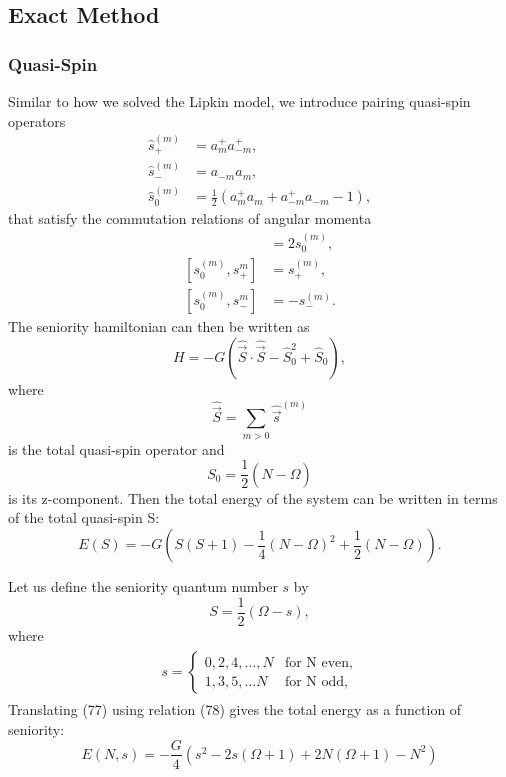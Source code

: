\documentclass[prb,aps,twocolumn,showpacs,10pt]{revtex4-2}
\begin{document}
\subsection{Exact Method}
\subsubsection{Quasi-Spin}

Similar to how we solved the Lipkin model, we introduce pairing quasi-spin operators
\begin{align}
\hat{s}_+^{(m)} &= a_m^+ a_{-m}^+,\\
\hat{s}_-^{(m)} &=  a_{-m} a_m,\\
\hat{s}_0^{(m)} &= \frac{1}{2} (a_m^+ a_m + a_{-m}^+ a_{-m} -1),
\end{align}
that satisfy the commutation relations of angular momenta
\begin{align}
[s_+^{(m)}, s_-^{m}] &= 2s_0^{(m)}, \\
[s_0^{(m)}, s_+^{m}] &= s_+^{(m)}, \\
[s_0^{(m)}, s_-^{m}] &= -s_-^{(m)}. 
\end{align}
The seniority hamiltonian can then be written as
\begin{equation}
H = -G(\hat{\vec{S}} \cdot \hat{\vec{S}} - \hat{S}^2_0 + \hat{S}_0),
\end{equation}
where 
\begin{equation}
\hat{\vec{S}} = \sum_{m>0} \hat{\vec{s}}^{(m)}
\end{equation}
is the total quasi-spin operator and
\begin{equation}
S_0 = \frac{1}{2} (\hat{N}-\Omega)
\end{equation}
is its z-component. Then the total energy of the system can be written in terms of the total quasi-spin S:
\begin{equation}
E(S) = -G \left( S(S+1) -\frac{1}{4}(N-\Omega)^2 + \frac{1}{2}(N-\Omega) \right).
\end{equation}


Let us define the seniority quantum number $s$ by 
\begin{equation}
S = \frac{1}{2} (\Omega-s),
\end{equation}
where 
\begin{align}
\begin{split}
 s = \begin{cases} 
      0, 2, 4, ..., N & \text{for N even},\\
      1,3,5, ... N & \text{for N odd},
   \end{cases}
\end{split}
\end{align}
Translating (77) using relation (78) gives the total energy as a function of seniority:
\begin{equation}
E(N,s) = -\frac{G}{4} (s^2-2s(\Omega+1)+2N(\Omega+1) - N^2)
\end{equation}
\end{document}
